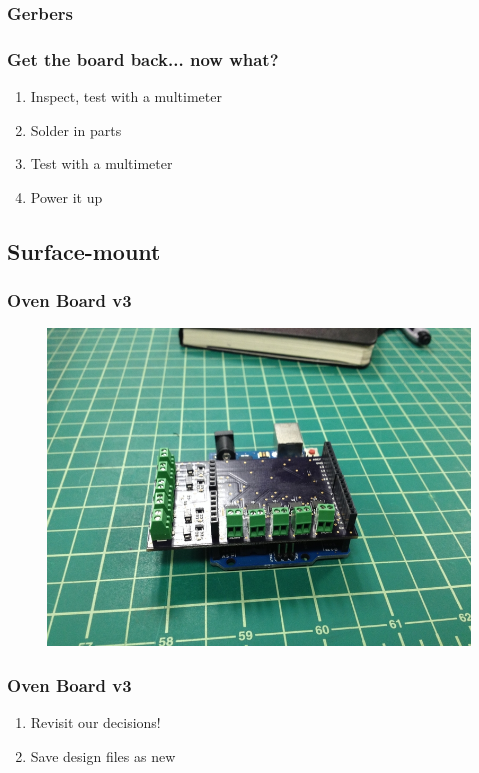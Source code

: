 \documentclass{beamer}
\begin{document}

\begin{frame}
\frametitle{Gerbers}
\end{frame}


\begin{frame}
\frametitle{Get the board back... now what?}
\begin{enumerate}
\item Inspect, test with a multimeter
\item Solder in parts
\item Test with a multimeter
\item Power it up
\end{enumerate}
\end{frame}

\subsection{Surface-mount}
\begin{frame}
\frametitle{Oven Board v3}
\begin{figure}
\includegraphics[width=0.8\linewidth]{ovenboard3-side.png}
\end{figure}
\end{frame}

\begin{frame}
\frametitle{Oven Board v3}
\begin{enumerate}
\item Revisit our decisions!
\item Save design files as new
\end{enumerate}
\end{frame}
\end{document}
